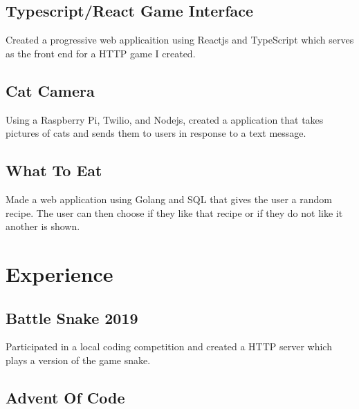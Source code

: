 \documentclass{article}
\newcommand{\hrefColored}[3]{\href{#2}{\color{#1}{#3}}}
\begin{document}
\subsection{Typescript/React Game Interface \hrefColored{blue}{https://github.com/McRaeAlex/DSnake-Typescript}{github.com/McRaeAlex/DSnake-Typescript}}

Created a progressive web applicaition using Reactjs and TypeScript which serves
as the front end for a HTTP game I created.

\subsection{Cat Camera \hrefColored{blue}{https://github.com/McRaeAlex/prettykitty}{github.com/McRaeAlex/prettykitty}}

Using a Raspberry Pi, Twilio, and Nodejs, created a application that takes 
pictures of cats and sends them to users in response to a text message.

\subsection{What To Eat \hrefColored{blue}{https://github.com/McRaeAlex/WhatToEat}{github.com/McRaeAlex/WhatToEat}}

Made a web application using Golang and SQL that gives the user a random recipe.
The user can then choose if they like that recipe or if they do not like it 
another is shown.

\section{Experience}

\subsection{Battle Snake 2019 \hrefColored{blue}{https://github.com/McRaeAlex/BattleSnake2019}{github.com/McRaeAlex/BattleSnake2019}}

Participated in a local coding competition and created a HTTP server which plays
a version of the game snake.

\subsection{Advent Of Code \hrefColored{blue}{https://github.com/McRaeAlex/AdventOfCode2018}{github.com/McRaeAlex/AdventOfCode2018}}
\end{document}

